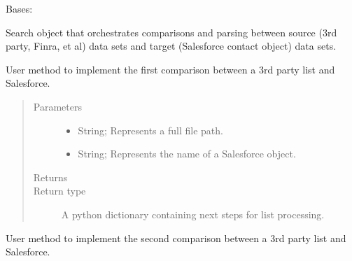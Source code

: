 \documentclass[letterpaper,10pt,english]{sphinxmanual}
\begin{document}
\begin{fulllineitems}
\label{\detokenize{index:ListManagement.search.salesforce.Search}}
Bases: 

Search object that orchestrates comparisons and parsing between
source (3rd party, Finra, et al) data sets and target
(Salesforce contact object) data sets.

\begin{fulllineitems}
\label{\detokenize{index:ListManagement.search.salesforce.Search.perform_search_one}}
User method to implement the first comparison between a 3rd party list and Salesforce.
\begin{quote}\begin{description}
\item[{Parameters}] \leavevmode\begin{itemize}
\item {} 
 \textendash{} String; Represents a full file path.

\item {} 
 \textendash{} String; Represents the name of a Salesforce object.

\end{itemize}

\item[{Returns}] \leavevmode


\item[{Return type}] \leavevmode
A python dictionary containing next steps for list processing.

\end{description}\end{quote}

\end{fulllineitems}


\begin{fulllineitems}
\label{\detokenize{index:ListManagement.search.salesforce.Search.perform_search_two}}
User method to implement the second comparison between a 3rd party list and Salesforce.


\end{fulllineitems}
\end{fulllineitems}
\end{document}
